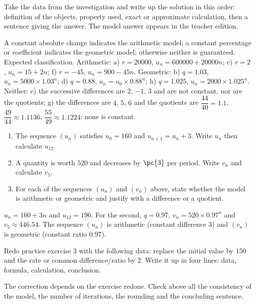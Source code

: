 \begin{example}
Take the data from the investigation and write up the solution in this order: definition of the objects, property used, exact or approximate calculation, then a sentence giving the answer. The model answer appears in the teacher edition.
\end{example}
\begin{solution}A constant absolute change indicates the arithmetic model; a constant percentage or coefficient indicates the geometric model; otherwise neither is guaranteed. Expected classification. Arithmetic: a) $r=\num{20000}$, $u_n=\num{600000}+\num{20000}n$; c) $r=2$, $u_n=15+2n$; f) $r=-45$, $u_n=900-45n$. Geometric: b) $q=\num{1,03}$, $u_n=\num{5000}\times\num{1,03}^n$; d) $q=\num{0,88}$, $u_n=u_0\times\num{0,88}^n$; h) $q=\num{1,025}$, $u_n=\num{2000}\times\num{1,025}^n$. Neither: e) the successive differences are $2$, $-1$, $3$ and are not constant, nor are the quotients; g) the differences are $4$, $5$, $6$ and the quotients are $\dfrac{44}{40}=\num{1,1}$, $\dfrac{49}{44}\approx\num{1,1136}$, $\dfrac{55}{49}\approx\num{1,1224}$: none is constant.\end{solution}

\begin{exercise}[essential]
\begin{enumerate}\item The sequence $(u_n)$ satisfies $u_0=160$ and $u_{n+1}=u_n+3$. Write $u_n$ then calculate $u_{12}$.\item A quantity is worth $520$ and decreases by $\pc{3}$ per period. Write $v_n$ and calculate $v_5$.\item For each of the sequences $(u_n)$ and $(v_n)$ above, state whether the model is arithmetic or geometric and justify with a difference or a quotient.\end{enumerate}
\end{exercise}
\begin{solution}$u_n=160+3n$ and $u_{12}=196$. For the second, $q=\num{0,97}$, $v_n=520\times\num{0,97}^n$ and $v_5\approx\num{446,54}$. The sequence $(u_n)$ is arithmetic (constant difference $3$) and $(v_n)$ is geometric (constant ratio $\num{0,97}$).\end{solution}


\begin{homework}Redo practice exercise 3 with the following data: replace the initial value by $150$ and the rate or common difference/ratio by $2$. Write it up in four lines: data, formula, calculation, conclusion.\end{homework}
\begin{solution}The correction depends on the exercise redone. Check above all the consistency of the model, the number of iterations, the rounding and the concluding sentence.\end{solution}

